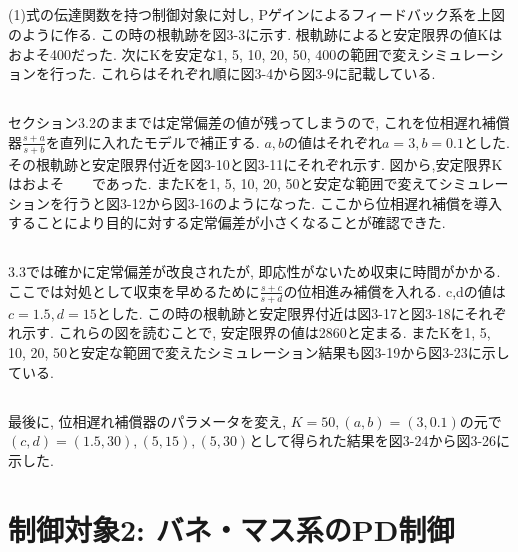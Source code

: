 \documentclass[12pt]{jsarticle}   	%
\begin{document}
\subsection{}
\noindent
(1)式の伝達関数を持つ制御対象に対し, Pゲインによるフィードバック系を上図のように作る. この時の根軌跡を図3-3に示す. 根軌跡によると安定限界の値Kはおよそ400だった. 
\newline
次にKを安定な1, 5, 10, 20, 50, 400の範囲で変えシミュレーションを行った. これらはそれぞれ順に図3-4から図3-9に記載している. 

\subsection{}
\noindent
セクション3.2のままでは定常偏差の値が残ってしまうので, これを位相遅れ補償器$\frac{s+a}{s+b}$を直列に入れたモデルで補正する. $a,b$の値はそれぞれ$a=3, b=0.1$とした. その根軌跡と安定限界付近を図3-10と図3-11にそれぞれ示す. 図から,安定限界Kはおよそ　　であった.
\newline
またKを1, 5, 10, 20, 50と安定な範囲で変えてシミュレーションを行うと図3-12から図3-16のようになった. ここから位相遅れ補償を導入することにより目的に対する定常偏差が小さくなることが確認できた. 

\subsection{}
\noindent
3.3では確かに定常偏差が改良されたが, 即応性がないため収束に時間がかかる. ここでは対処として収束を早めるために$\frac{s+c}{s+d}$の位相進み補償を入れる. c,dの値は$c=1.5,d=15$とした. この時の根軌跡と安定限界付近は図3-17と図3-18にそれぞれ示す.
\newline
これらの図を読むことで, 安定限界の値は2860と定まる. またKを1, 5, 10, 20, 50と安定な範囲で変えたシミュレーション結果も図3-19から図3-23に示している.

\subsection{}
\noindent
最後に, 位相遅れ補償器のパラメータを変え, $K=50, (a, b) = (3, 0.1)$の元で$(c, d) = (1.5, 30), (5, 15), (5, 30)$として得られた結果を図3-24から図3-26に示した.


\section{制御対象2: バネ・マス系のPD制御}
\end{document}
